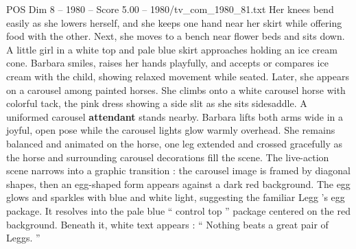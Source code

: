 \begin{textsample}{POS Dim 8 – 1980 – Score 5.00 – 1980/tv\_com\_1980\_81.txt}
Her knees bend easily as she lowers herself, and she keeps one hand near her skirt while offering food with the other.
Next, she moves to a bench near flower beds and sits down.
A little girl in a white top and pale blue skirt approaches holding an ice cream cone.
Barbara smiles, raises her hands playfully, and accepts or compares ice cream with the child, showing relaxed movement while seated.
Later, she appears on a carousel among painted horses.
She climbs onto a white carousel horse with colorful tack, the pink dress showing a side slit as she sits sidesaddle.
A uniformed carousel \textbf{attendant} stands nearby.
Barbara lifts both arms wide in a joyful, open pose while the carousel lights glow warmly overhead.
She remains balanced and animated on the horse, one leg extended and crossed gracefully as the horse and surrounding carousel decorations fill the scene.
The live-action scene narrows into a graphic transition : the carousel image is framed by diagonal shapes, then an egg-shaped form appears against a dark red background.
The egg glows and sparkles with blue and white light, suggesting the familiar Legg ’s egg package.
It resolves into the pale blue “ control top ” package centered on the red background.
Beneath it, white text appears : “ Nothing beats a great pair of Leggs. ”

\end{textsample}
